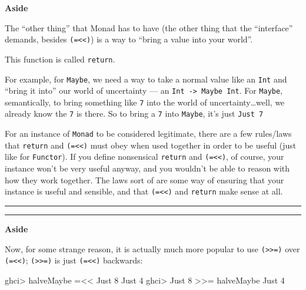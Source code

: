 \documentclass[]{article}
\newenvironment{Shaded}{}{}
\newcommand{\DataTypeTok}[1]{\textcolor[rgb]{0.56,0.13,0.00}{{#1}}}
\newcommand{\DecValTok}[1]{\textcolor[rgb]{0.25,0.63,0.44}{{#1}}}
\newcommand{\FunctionTok}[1]{\textcolor[rgb]{0.02,0.16,0.49}{{#1}}}
\newcommand{\NormalTok}[1]{{#1}}
\begin{document}
\textbf{Aside}

The ``other thing'' that Monad has to have (the other thing that the ``interface'' demands, besides
\texttt{(=\textless{}\textless{})}) is a way to ``bring a value into your world''.

This function is called \texttt{return}.

For example, for \texttt{Maybe}, we need a way to take a normal value like an \texttt{Int} and
``bring it into'' our world of uncertainty --- an \texttt{Int\ -\textgreater{}\ Maybe\ Int}. For
\texttt{Maybe}, semantically, to bring something like \texttt{7} into the world of
uncertainty\ldots{}well, we already know the \texttt{7} is there. So to bring a \texttt{7} into
\texttt{Maybe}, it's just \texttt{Just\ 7}

For an instance of \texttt{Monad} to be considered legitimate, there are a few rules/laws that
\texttt{return} and \texttt{(=\textless{}\textless{})} must obey when used together in order to be
useful (just like for \texttt{Functor}). If you define nonsensical \texttt{return} and
\texttt{(=\textless{}\textless{})}, of course, your instance won't be very useful anyway, and you
wouldn't be able to reason with how they work together. The laws sort of are some way of ensuring
that your instance is useful and sensible, and that \texttt{(=\textless{}\textless{})} and
\texttt{return} make sense at all.

\begin{center}\rule{0.5\linewidth}{\linethickness}\end{center}

\begin{center}\rule{0.5\linewidth}{\linethickness}\end{center}

\textbf{Aside}

Now, for some strange reason, it is actually much more popular to use
\texttt{(\textgreater{}\textgreater{}=)} over \texttt{(=\textless{}\textless{})};
\texttt{(\textgreater{}\textgreater{}=)} is just \texttt{(=\textless{}\textless{})} backwards:

\begin{Shaded}
\begin{Highlighting}[]
\NormalTok{ghci}\FunctionTok{>} \NormalTok{halveMaybe }\FunctionTok{=<<} \DataTypeTok{Just} \DecValTok{8}
\DataTypeTok{Just} \DecValTok{4}
\NormalTok{ghci}\FunctionTok{>} \DataTypeTok{Just} \DecValTok{8} \FunctionTok{>>=} \NormalTok{halveMaybe}
\DataTypeTok{Just} \DecValTok{4}
\end{Highlighting}
\end{Shaded}
\end{document}
